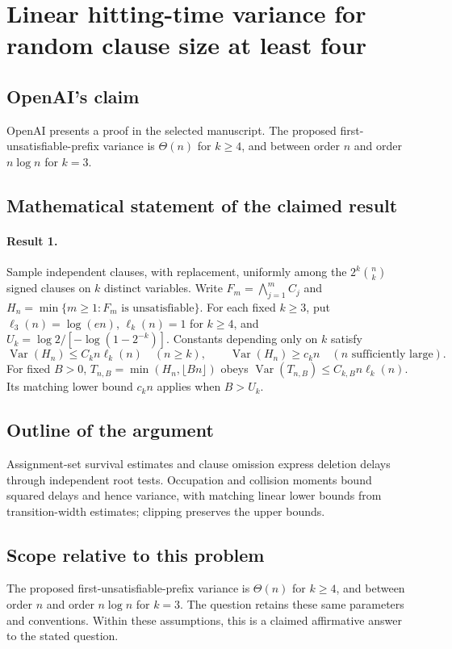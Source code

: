 \documentclass[11pt]{article}
\begin{document}
\section*{Linear hitting-time variance for random clause size at least four}

\subsection{OpenAI's claim}
OpenAI presents a proof in the selected manuscript. The proposed first-unsatisfiable-prefix variance is $\Theta(n)$ for $k\geq4$, and between order $n$ and order $n\log n$ for $k=3$.

\subsection{Mathematical statement of the claimed result}
\paragraph{Result 1.} Sample independent clauses, with replacement, uniformly among the $2^k\binom nk$ signed clauses on $k$ distinct variables. Write $F_m=\bigwedge_{j=1}^mC_j$ and $H_n=\min\{m\ge1:F_m\text{ is unsatisfiable}\}$. For each fixed $k\ge3$, put $\ell_3(n)=\log(en)$, $\ell_k(n)=1$ for $k\ge4$, and $U_k=\log2/[-\log(1-2^{-k})]$. Constants depending only on $k$ satisfy
\[
 \operatorname{Var}(H_n)\le C_kn\ell_k(n)\quad(n\ge k),\qquad
 \operatorname{Var}(H_n)\ge c_kn\quad(n\text{ sufficiently large}).
\]
For fixed $B>0$, $T_{n,B}=\min(H_n,\lfloor Bn\rfloor)$ obeys $\operatorname{Var}(T_{n,B})\le C_{k,B}n\ell_k(n)$. Its matching lower bound $c_kn$ applies when $B>U_k$.

\subsection{Outline of the argument}
Assignment-set survival estimates and clause omission express deletion delays through independent root tests. Occupation and collision moments bound squared delays and hence variance, with matching linear lower bounds from transition-width estimates; clipping preserves the upper bounds.

\subsection{Scope relative to this problem}
The proposed first-unsatisfiable-prefix variance is $\Theta(n)$ for $k\geq4$, and between order $n$ and order $n\log n$ for $k=3$. The question retains these same parameters and conventions. Within these assumptions, this is a claimed affirmative answer to the stated question.
\end{document}
